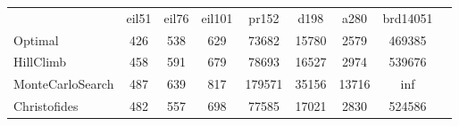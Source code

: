 \begin{tabular}[ht]{|l||c|c|c|c|c|c|c|H}
 & eil51 & eil76 & eil101 & pr152 & d198 & a280 & brd14051 & \\  
Optimal &426 & 538 & 629 & 73682 & 15780 & 2579 & 469385 & \\ 
HillClimb &458 & 591 & 679 & 78693 & 16527 & 2974 & 539676 & \\ 
MonteCarloSearch &487 & 639 & 817 & 179571 & 35156 & 13716 & inf & \\ 
Christofides &482 & 557 & 698 & 77585 & 17021 & 2830 & 524586 & \\ 
\end{tabular}